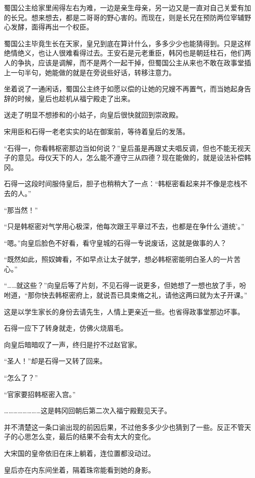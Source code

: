 蜀国公主给家里闹得左右为难，一边是亲生母亲，另一边又是一直对自己关爱有加的长兄。想来想去，都是二哥哥的野心害的。而现在，则是长兄在预防两位宰辅野心发酵，面得再出一个权臣。

蜀国公主毕竟生长在天家，皇兄到底在算计什么，多多少少也能猜得到。只是这样绝情绝义，也让人很难看得过去。王安石是元老重臣，韩冈也是朝廷柱石，他们两人的争执，应该是调解，而不是两个一起干掉，但蜀国公主从来也不敢在政事堂插上一句半句，她能做的就是在旁说些好话，转移注意力。

坐着说了一通闲话，蜀国公主终于如愿以偿的让她的兄嫂不再置气，而当她起身告辞的时候，皇后也趁机从福宁殿走了出来。

送走了明显不想掺和的小姑子，向皇后很快就回到崇政殿。

宋用臣和石得一老老实实的站在御案前，等待着皇后的发落。

“石得一，你看韩枢密那边当如何说？”皇后虽是再跟丈夫唱反调，但也不能无视天子的意见。母仪天下的人，怎么能不遵守三从四德？现在能做的，就是设法补偿韩冈。

石得一这段时间服侍皇后，胆子也稍稍大了一点：“韩枢密看起来并不像是恋栈不去的人。”

“那当然！”

“只是韩枢密对气学用心极深，他每次跟王平章过不去，也都是在争什么‘道统’。”

“嗯。”向皇后脸色不好看，看守皇城的石得一专说废话，这就是做事的人？

“既然如此，照奴婢看，不如早点让太子就学，想必韩枢密能明白圣人的一片苦心。”

“……就这些？”向皇后等了片刻，不见石得一说更多，但她想了一想也放了手，吩咐道，“那你快去韩枢密府上，就说吾已具束脩之礼，请他这两曰就为太子开课。”

这是以学生家长的身份去请先生，人情上更亲近一些。也省得政事堂那边坏事。

石得一应下了转身就走，仿佛火烧眉毛。

向皇后暗暗叹了一声，终归是拧不过赵官家。

“圣人！”却是石得一又转了回来。

“怎么了？”

“官家要招韩枢密入宫。”

……………………这是韩冈回朝后第二次入福宁殿觐见天子。

并不清楚这一条口谕出现的前因后果，不过他多多少少也猜到了一些。反正不管天子的心思怎么变，最后的结果不会有太大的变化。

大宋国的皇帝依旧在床上躺着，连位置都没动过。

皇后亦在内东间坐着，隔着珠帘能看到她的身影。


